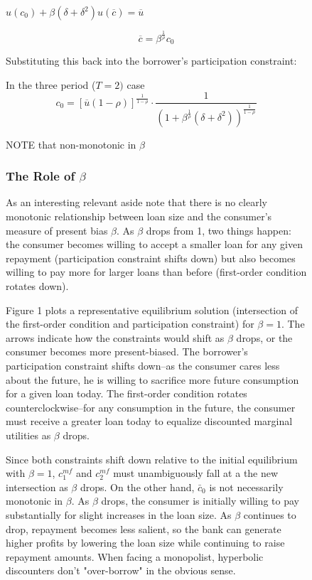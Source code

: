 \documentclass[11pt]{article}%
\begin{document}
\begin{figure}
{\(u(c_{0})+\beta(\delta+\delta^{2})u(\overline{c})  =\overline{u}\)


\[
\overline{c}=\beta^{\frac{1}{\rho}}c_{0}%
\]


Substituting this back into the borrower's participation constraint:



In the three period ($T=2)$ case
\[
c_{0}=\left[  \overline{u}(1-\rho)\right]  ^{\frac{1}{1-\rho}}\cdot\frac
{1}{(1+\beta^{\frac{1}{\rho}}\left(  \delta+\delta^{2}\right)  )^{\frac
{1}{1-\rho}}}%
\]


NOTE that non-monotonic in $\beta$


\subsubsection{The Role of $\beta$}

As an interesting relevant aside note that there is no clearly monotonic
relationship between loan size and the consumer's measure of present bias
$\beta$. As $\beta$ drops from 1, two things happen: the consumer becomes
willing to accept a smaller loan for any given repayment (participation
constraint shifts down) but also becomes willing to pay more for larger loans
than before (first-order condition rotates down).

Figure 1 plots a representative equilibrium solution (intersection of the
first-order condition and participation constraint) for $\beta=1$. The arrows
indicate how the constraints would shift as $\beta$ drops, or the consumer
becomes more present-biased. The borrower's participation constraint shifts
down--as the consumer cares less about the future, he is willing to sacrifice
more future consumption for a given loan today. The first-order condition
rotates counterclockwise--for any consumption in the future, the consumer must
receive a greater loan today to equalize discounted marginal utilities as
$\beta$ drops.

Since both constraints shift down relative to the initial equilibrium with
$\beta=1$, $c_{1}^{mf}$ and $c_{2}^{mf}$ must unambiguously fall at a the new
intersection as $\beta$ drops. On the other hand, $\bar{c}_{0}$ is not
necessarily monotonic in $\beta$. As $\beta$ drops, the consumer is initially
willing to pay substantially for slight increases in the loan size. As $\beta$
continues to drop, repayment becomes less salient, so the bank can generate
higher profits by lowering the loan size while continuing to raise repayment
amounts. When facing a monopolist, hyperbolic discounters don't "over-borrow"
in the obvious sense.

}
\end{figure}
\end{document}
